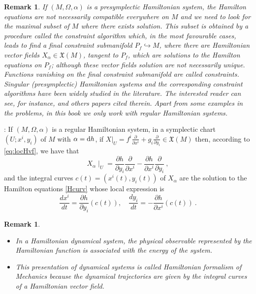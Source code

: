 \documentclass[12pt]{report}
\newtheorem{remark}[teor]{Remark}
\def\derpar#1#2{\frac{\partial{#1}}{\partial{#2}}}
\def\vf{\mathfrak X}
\def\d{{\rm d}}
\begin{document}
\bigskip
\begin{remark}{\rm 
If $(M,\Omega,\alpha)$ is a presymplectic Hamiltonian system,
the Hamilton equations are not necessarily compatible everywhere on $M$ and we need to look for the maximal subset of $M$ where there exists solution. 
This subset is obtained by a procedure called the {\sl constraint algorithm} which, in the most favourable cases, 
leads to find  a {\sl final constraint submanifold} $P_f\hookrightarrow M$, where there are Hamiltonian vector fields $X_\alpha\in\vf(M)$,
tangent to $P_f$, which are
solutions to the Hamilton equations on $P_f$; although 
these vector fields solution are not necessarily unique. 
Functions vanishing on the final constraint submanifold are called {\sl constraints}.
Singular (presymplectic) Hamiltonian systems and the corresponding constraint algorithms
have been widely studied in the literature. The interested reader can 
see, for instance, \cite{Ca-90,CGIR-85,Dir-64,GNH-78,GP-92,HRT-76,ILDM-99,MMT-97,Mu-89,Sn-74}
and others papers cited therein. Apart from some examples in the problems, 
in this book we only work with regular Hamiltonian systems. 
}\end{remark}

\bigskip
{}:
If $(M,\Omega, \alpha)$ is a regular Hamiltonian system, in a symplectic chart $(U;x^i,y_i)$ of $M$ with $\alpha=\d h$,
if $\displaystyle X\vert_U=f^i\derpar{}{x^i}+g_i\derpar{}{y_i}\in\vf (M)$
then, according to \eqref{eq:locHvf}, we have that
$$
X_{\alpha}\mid_U = \derpar{h}{y_i}\derpar{}{x^i}-\derpar{h}{x^i}\derpar{}{y_i} \ ,
$$
and the integral curves $c(t)=(x^i(t),y_i(t))$ of $X_{\alpha}$ are the solution to the Hamilton equations \eqref{Hcurv} whose local expression is
$$
\frac{d x^i}{d t} = \derpar{h}{y_i}(c(t))
,\quad
\frac{d y_i}{d t} = -\derpar{h}{x^i}(c(t)) \ .
$$

\begin{remark}{\rm 
\begin{itemize}
\item
In a Hamiltonian dynamical  system,
the physical observable represented by the Hamiltonian function 
is associated with the energy of the system.
\item
This presentation of dynamical systems
is called {\sl Hamiltonian formalism of Mechanics} 
because the dynamical trajectories
are given by  the integral curves of a Hamiltonian vector field.
\end{itemize}
}\end{remark}
\end{document}
